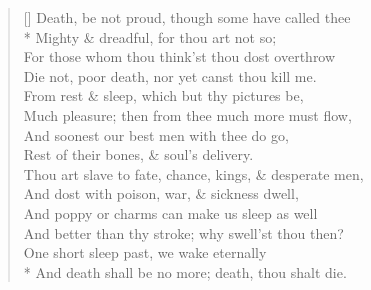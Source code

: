 \documentclass[MAIN]{subfiles}
\begin{document}
\settowidth{\versewidth}{Thou art slave to fate, chance, kings, \& desperate men,}
\begin{verse}[\versewidth]
Death, be not proud, though some have called thee\\*
\vin Mighty \& dreadful, for thou art not so;\\
\vin For those whom thou think'st thou dost overthrow\\
Die not, poor death, nor yet canst thou kill me.\\
From rest \& sleep, which but thy pictures be,\\
\vin Much pleasure; then from thee much more must flow,\\
\vin And soonest our best men with thee do go,\\
Rest of their bones, \& soul's delivery.\\
Thou art slave to fate, chance, kings, \& desperate men,\\
\vin And dost with poison, war, \& sickness dwell,\\
\vin And poppy or charms can make us sleep as well\\
And better than thy stroke; why swell'st thou then?\\
\vin \vin One short sleep past, we wake eternally\\*
\vin \vin And death shall be no more; death, thou shalt die.
\end{verse}
\end{document}
